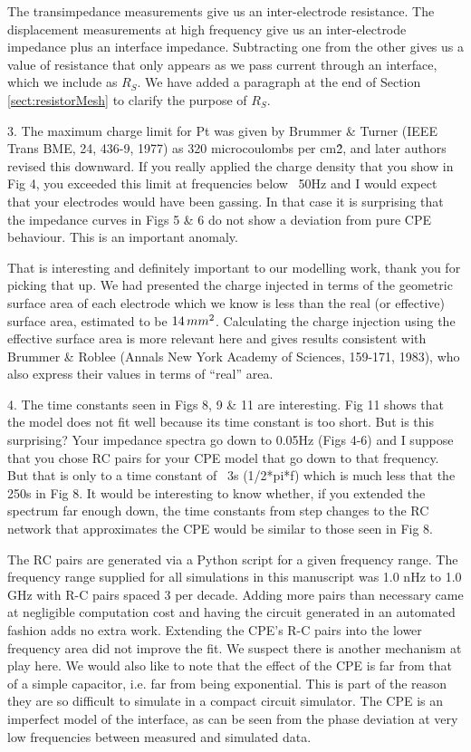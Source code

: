 \documentclass[journal, a4paper]{IEEEtran}
\begin{document}
{{        The transimpedance measurements give us an inter-electrode resistance. The displacement measurements at high frequency give us an inter-electrode impedance plus an interface impedance. Subtracting one from the other gives us a value of resistance that only appears as we pass current through an interface, which we include as $R_{S}$. We have added a paragraph at the end of Section \ref{sect:resistorMesh} to clarify the purpose of $R_{S}$.
    }

    3. The maximum charge limit for Pt was given by Brummer \& Turner (IEEE Trans BME, 24, 436-9, 1977) as 320 microcoulombs per cm\^2, and later authors revised this downward. If you really applied the charge density that you show in Fig 4, you exceeded this limit at frequencies below ~50Hz and I would expect that your electrodes would have been gassing. In that case it is surprising that the impedance curves in Figs 5 \& 6 do not show a deviation from pure CPE behaviour. This is an important anomaly.

    {
        \color{blue}
        That is interesting and definitely important to our modelling work, thank you for picking that up. We had presented the charge injected in terms of the geometric surface area of each electrode which we know is less than the real (or effective) surface area, estimated to be $14\thinspace mm^{2}$. Calculating the charge injection using the effective surface area is more relevant here and gives results consistent with Brummer \& Roblee (Annals New York Academy of Sciences, 159-171, 1983), who also express their values in terms of ``real'' area. 

    }

    4. The time constants seen in Figs 8, 9 \& 11 are interesting. Fig 11 shows that the model does not fit well because its time constant is too short. But is this surprising? Your impedance spectra go down to 0.05Hz (Figs 4-6) and I suppose that you chose RC pairs for your CPE model that go down to that frequency. But that is only to a time constant of ~3s (1/2*pi*f) which is much less that the 250s in Fig 8. It would be interesting to know whether, if you extended the spectrum far enough down, the time constants from step changes to the RC network that approximates the CPE would be similar to those seen in Fig 8.

    {
        \color{blue}
        The RC pairs are generated via a Python script for a given frequency range. The frequency range supplied for all simulations in this manuscript was 1.0 nHz to 1.0 GHz with R-C pairs spaced 3 per decade. Adding more pairs than necessary came at negligible computation cost and having the circuit generated in an automated fashion adds no extra work. Extending the CPE's R-C pairs into the lower frequency area did not improve the fit. We suspect there is another mechanism at play here.
        We would also like to note that the effect of the CPE is far from that of a simple capacitor, i.e. far from being exponential. This is part of the reason they are so difficult to simulate in a compact circuit simulator. The CPE is an imperfect model of the interface, as can be seen from the phase deviation at very low frequencies between measured and simulated data.
    }

}
\end{document}
